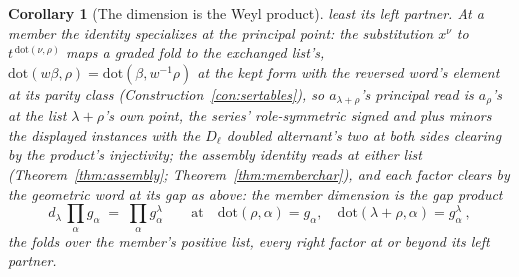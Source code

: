 \documentclass[11pt]{article}
\newtheorem{corollary}{Corollary}
\theoremstyle{definition}
\begin{document}
\begin{corollary}[The dimension is the Weyl product]
least its left partner. At a member the identity
specializes at the principal point: the substitution $x^\nu$ to
$t^{\,\mathrm{dot}(\nu,\rho)}$ maps a graded fold to the
exchanged list's,
$\mathrm{dot}(w\beta,\rho)=\mathrm{dot}(\beta,w^{-1}\rho)$ at
the kept form with the reversed word's element at its parity
class (Construction~\ref{con:sertables}), so
$a_{\lambda+\rho}$'s principal read is $a_\rho$'s at the list
$\lambda+\rho$'s own point, the series' role-symmetric signed
and plus minors the displayed instances with the $D_\ell$
doubled alternant's two at both sides clearing by the product's
injectivity; the assembly identity reads at either list
(Theorem~\ref{thm:assembly}; Theorem~\ref{thm:memberchar}), and
each factor clears by the geometric word at its
gap as above: the member dimension is the gap product
\[
d_\lambda\,\prod_{\alpha}g_\alpha
\;=\;\prod_{\alpha}g^{\lambda}_{\alpha}
\qquad\text{at}\quad
\mathrm{dot}(\rho,\alpha)=g_\alpha,\quad
\mathrm{dot}(\lambda{+}\rho,\alpha)=g^{\lambda}_{\alpha}\ ,
\]
the folds over the member's positive list, every right factor at
or beyond its left partner.
\end{corollary}
\end{document}

